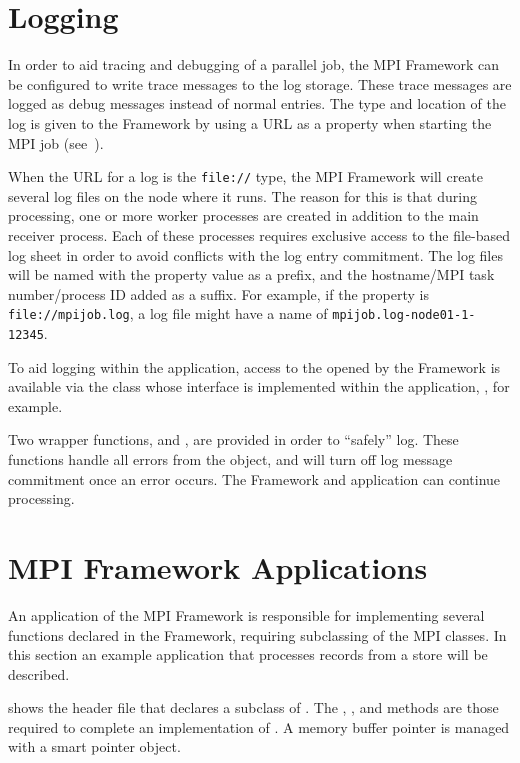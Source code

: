 \section{Logging}
\label{sec-mpilogging}
In order to aid tracing and debugging of a parallel job, the MPI Framework
can be configured to write trace messages to the log storage. These trace
messages are logged as debug messages instead of normal entries.
The type and location of the log is given to the 
Framework by using a URL as a property when starting the MPI
job (see~).

When the URL for a log is the {\tt file://} type, the MPI Framework will create
several log files on the node where it runs. The reason for this is that during
 processing, one or more worker processes are created in
addition to the main receiver process. Each of these processes requires
exclusive access to the file-based log sheet in order to avoid conflicts with
the log entry commitment.
The log files will be named with the property value
as a prefix, and the hostname/MPI task number/process ID added as a suffix.
For example, if the property is \verb=file://mpijob.log=, a log file might
have a name of \verb=mpijob.log-node01-1-12345=.

To aid logging within the application, access to the  opened
by the Framework is available via the class whose interface is implemented
within the application, , for example.

Two wrapper functions,  and ,
are provided in order to ``safely'' log. These functions handle all errors
from the  object, and will turn off log message commitment
once an error occurs. The Framework and application can continue processing.

\section{MPI Framework Applications}
\label{sec-mpiapp}

An application of the MPI Framework is responsible for implementing several
functions declared in the Framework, requiring subclassing of the MPI classes.
In this section an example application that processes records from a store will
be described. 

 shows the header file that declares a subclass of
. The ,
, and  methods are those
required to complete an implementation of .
A memory buffer pointer is managed with a smart pointer object.

